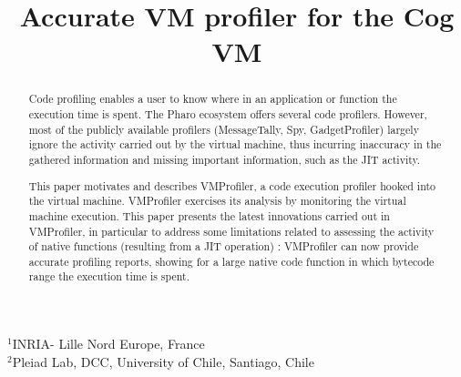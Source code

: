 \documentclass[10pt,preprint,nonatbib]{sigplanconf}
\newcommand{\Title}{Accurate VM profiler for the Cog VM}
\newcommand{\Authors}{Sophie Kaleba, Cl\'ement B\'era, Alexandre Bergel$^3$\\[2 ex]
$^3$Pleiad Lab, DCC, University of Chile}
\begin{document}
\setlength{\pdfpageheight}{\paperheight}
\setlength{\pdfpagewidth}{\paperwidth}



\title{\Title}


           {$^1$INRIA- Lille Nord Europe, France\\
             $^2$Pleiad Lab, DCC, University of Chile, Santiago, Chile}
           {}


\maketitle

\begin{abstract}

Code profiling enables a user to know where in an application or function the execution time is spent. The Pharo ecosystem offers several code profilers. However, most of the publicly available profilers (MessageTally, Spy, GadgetProfiler) largely ignore the activity carried out by the virtual machine, thus incurring inaccuracy in the gathered information and missing important information, such as the JIT activity.

This paper motivates and describes VMProfiler, a code execution profiler hooked into the virtual machine. VMProfiler exercises its analysis by monitoring the virtual machine execution. This paper presents the latest innovations carried out in VMProfiler, in particular to address some limitations related to assessing the activity of native functions (resulting from a JIT operation) : VMProfiler can now provide accurate profiling reports, showing for a large native code function in which bytecode range the execution time is spent.

%
%

\end{abstract}
\end{document}
